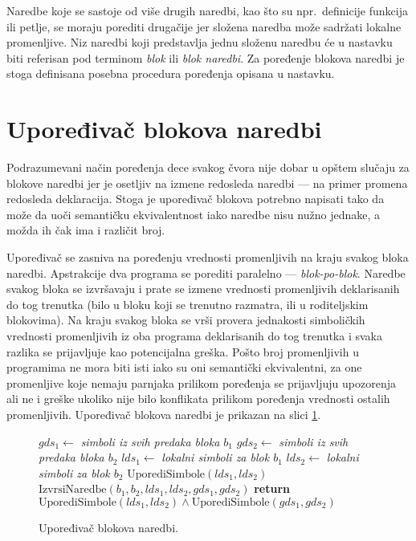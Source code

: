 Naredbe koje se sastoje od više drugih naredbi, kao što su npr.~definicije funkcija ili petlje, se moraju porediti drugačije jer složena naredba može sadržati lokalne promenljive. Niz naredbi koji predstavlja jednu složenu naredbu će u nastavku biti referisan pod terminom \emph{blok} ili \emph{blok naredbi}. Za poređenje blokova naredbi je stoga definisana posebna procedura poređenja opisana u nastavku.


\section{Upoređivač blokova naredbi}
\label{sec:ASTComparingBlocks}

Podrazumevani način poređenja dece svakog čvora nije dobar u opštem slučaju za blokove naredbi jer je osetljiv na izmene redosleda naredbi --- na primer promena redosleda deklaracija. Stoga je upoređivač blokova potrebno napisati tako da može da uoči semantičku ekvivalentnost iako naredbe nisu nužno jednake, a možda ih čak ima i različit broj.

Upoređivač se zasniva na poređenju vrednosti promenljivih na kraju svakog bloka naredbi. Apstrakcije dva programa se porediti paralelno --- \emph{blok-po-blok}. Naredbe svakog bloka se izvršavaju i prate se izmene vrednosti promenljivih deklarisanih do tog trenutka (bilo u bloku koji se trenutno razmatra, ili u roditeljskim blokovima). Na kraju svakog bloka se vrši provera jednakosti simboličkih vrednosti promenljivih iz oba programa deklarisanih do tog trenutka i svaka razlika se prijavljuje kao potencijalna greška. Pošto broj promenljivih u programima ne mora biti isti iako su oni semantički ekvivalentni, za one promenljive koje nemaju parnjaka prilikom poređenja se prijavljuju upozorenja ali ne i greške ukoliko nije bilo konflikata prilikom poređenja vrednosti ostalih promenljivih. Upoređivač blokova naredbi je prikazan na slici \ref{fig:ComparisonAlgorithmBlocksPseudo}.

\begin{figure}[!h]
\begin{algorithmic}[1]
\State $gds_1 \gets $ \emph{simboli iz svih predaka bloka $b_1$}
\State $gds_2 \gets $ \emph{simboli iz svih predaka bloka $b_2$}
\State $lds_1 \gets $ \emph{lokalni simboli za blok $b_1$}
\State $lds_2 \gets $ \emph{lokalni simboli za blok $b_2$}
\State $\text{UporediSimbole}(lds_1, lds_2)$
\State $\text{IzvrsiNaredbe}(b_1, b_2, lds_1, lds_2, gds_1, gds_2)$
\State \textbf{return} $\text{UporediSimbole}(lds_1, lds_2) \wedge \text{UporediSimbole}(gds_1, gds_2)$
\EndProcedure
\end{algorithmic}
\caption{Upoređivač blokova naredbi.}
\label{fig:ComparisonAlgorithmBlocksPseudo}
\end{figure}

